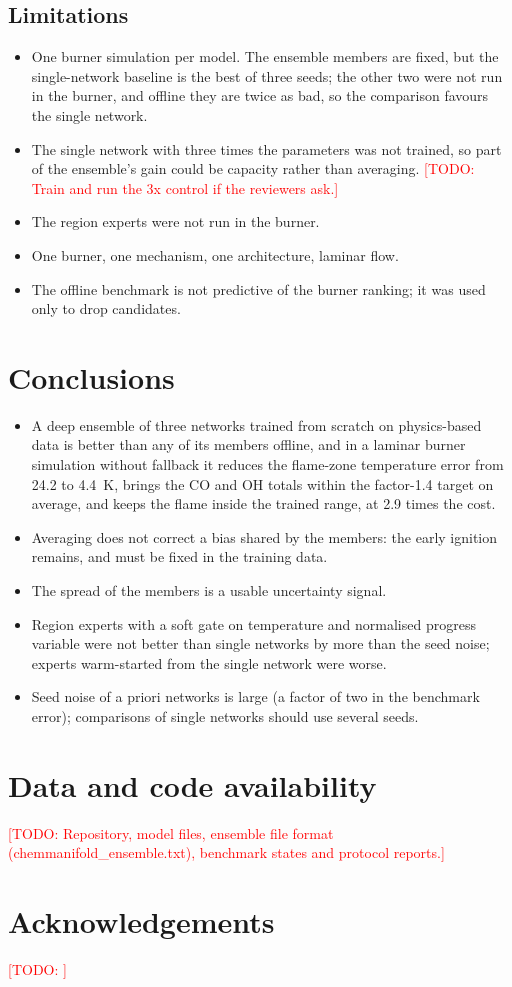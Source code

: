 \documentclass[preprint,review,12pt]{elsarticle}
\newcommand{\todo}[1]{\textcolor{red}{[TODO: #1]}}
\begin{document}
\subsection{Limitations}
\label{sec:limits}
\begin{itemize}
\item One burner simulation per model. The ensemble members are fixed, but the single-network baseline
  is the best of three seeds; the other two were not run in the burner, and offline they are twice as
  bad, so the comparison favours the single network.
\item The single network with three times the parameters was not trained, so part of the ensemble's gain
  could be capacity rather than averaging. \todo{Train and run the 3x control if the reviewers ask.}
\item The region experts were not run in the burner.
\item One burner, one mechanism, one architecture, laminar flow.
\item The offline benchmark is not predictive of the burner ranking; it was used only to drop candidates.
\end{itemize}

\section{Conclusions}
\label{sec:concl}
\begin{itemize}
\item A deep ensemble of three networks trained from scratch on physics-based data is better than any of
  its members offline, and in a laminar burner simulation without fallback it reduces the flame-zone
  temperature error from 24.2 to 4.4~K, brings the CO and OH totals within the factor-1.4 target on average, and keeps the flame
  inside the trained range, at 2.9 times the cost.
\item Averaging does not correct a bias shared by the members: the early ignition remains, and must be
  fixed in the training data.
\item The spread of the members is a usable uncertainty signal.
\item Region experts with a soft gate on temperature and normalised progress variable were not better than
  single networks by more than the seed noise; experts warm-started from the single network were worse.
\item Seed noise of a priori networks is large (a factor of two in the benchmark error); comparisons of
  single networks should use several seeds.
\end{itemize}

\section*{Data and code availability}
\todo{Repository, model files, ensemble file format (chemmanifold\_ensemble.txt), benchmark states and
protocol reports.}

\section*{Acknowledgements}
\todo{}



\end{document}
